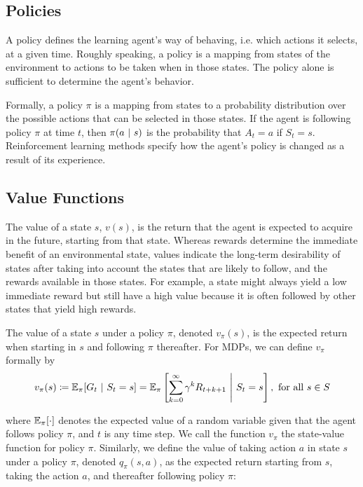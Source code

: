 \subsection{Policies}

A policy defines the learning agent’s way of behaving, i.e. which actions it selects, at a given time. Roughly speaking, a policy is a mapping from states of the environment to actions to be taken when in those states. The policy alone is sufficient to determine the agent's behavior.

Formally, a policy $\pi$ is a mapping from states to a probability distribution over the possible actions that can be selected in those states. If the agent is following policy $\pi$ at time $t$, then $\pi(a \ |\  s)$ is the probability that $A_t = a$ if $S_t = s$. Reinforcement learning methods specify how the agent’s policy is changed as a result of its experience.

\subsection{Value Functions}

The value of a state $s$, $v(s)$, is the return that the agent is expected to acquire in the future, starting from that state. Whereas rewards determine the immediate benefit of an environmental state, values indicate the long-term desirability of states after taking into account the states that are likely to follow, and the rewards available in those states. For example, a state might always yield a low immediate reward but still have a high value because it is often followed by other states that yield high rewards.

The value of a state $s$ under a policy $\pi$, denoted $v_\pi(s)$, is the expected return when starting in $s$ and following $\pi$ thereafter. For MDPs, we can define $v_\pi$ formally by
\begin{equation}
    v_\pi(s) \coloneqq \mathbb{E}_\pi[G_t \ |\  S_t = s] = \mathbb{E}_\pi\left[\sum_{k=0}^{\infty} \gamma^k R_{t+k+1} \ \Biggr\rvert\  S_t = s\right], \text{ for all } s \in S
\end{equation}
    
where $\mathbb{E}_\pi[\cdot]$ denotes the expected value of a random variable given that the agent follows policy $\pi$, and $t$ is any time step. We call the function $v_\pi$ the state-value function for policy $\pi$.
Similarly, we define the value of taking action $a$ in state $s$ under a policy $\pi$, denoted $q_\pi(s, a)$, as the expected return starting from $s$, taking the action $a$, and thereafter following policy $\pi$:

